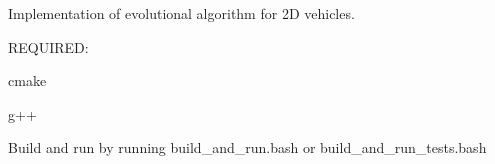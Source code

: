 Implementation of evolutional algorithm for 2D vehicles.

R\+E\+Q\+U\+I\+R\+ED\+:
\begin{DoxyItemize}
\item cmake
\item g++
\end{DoxyItemize}

Build and run by running build\+\_\+and\+\_\+run.\+bash or build\+\_\+and\+\_\+run\+\_\+tests.\+bash 